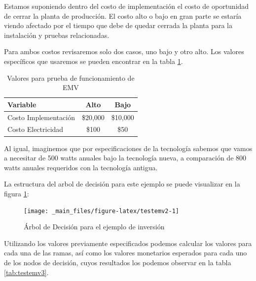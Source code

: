 \documentclass[
]{book}
\begin{document}
Estamos suponiendo dentro del costo de implementación el costo de
oportunidad de cerrar la planta de producción. El costo alto o bajo en
gran parte se estaría viendo afectado por el tiempo que debe de quedar
cerrada la planta para la instalación y pruebas relacionadas.

Para ambos costos revisaremos solo dos casos, uno bajo y otro alto. Los
valores específicos que usaremos se pueden encontrar en la tabla
\ref{tab:testemv1}.

\begin{table}

\caption{\label{tab:testemv1}Valores para prueba de funcionamiento de EMV}
\centering
\begin{tabular}[t]{l|c|c}
\hline
Variable & Alto & Bajo\\
\hline
Costo Implementación & \$20,000 & \$10,000\\
\hline
Costo Electricidad & \$100 & \$50\\
\hline
\end{tabular}
\end{table}

Al igual, imaginemos que por especificaciones de la tecnología sabemos
que vamos a necesitar de 500 watts anuales bajo la tecnología
nueva, a comparación de 800 watts anuales requeridos con la
tecnología antigua.

La estructura del arbol de decisión para este ejemplo se puede
visualizar en la figura \ref{fig:testemv2}:

\begin{figure}

{\centering \texttt{[image: \_main\_files/figure-latex/testemv2-1]} 

}

\caption{Árbol de Decisión para el ejemplo de inversión}\label{fig:testemv2}
\end{figure}

Utilizando los valores previamente especificados podemos calcular los
valores para cada una de las ramas, así como los valores monetarios
esperados para cada uno de los nodos de decisión, cuyos resultados los
podemos observar en la tabla \ref{tab:testemv3}.
\end{document}
